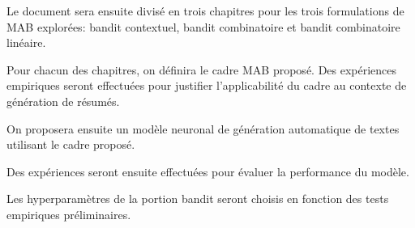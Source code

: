 Le document sera ensuite divisé en trois chapitres pour les trois formulations de MAB explorées:
bandit contextuel, bandit combinatoire et bandit combinatoire linéaire.

Pour chacun des chapitres, on définira le cadre MAB proposé.
Des expériences empiriques seront effectuées pour justifier l'applicabilité
du cadre au contexte de génération de résumés.

On proposera ensuite un modèle neuronal
de génération automatique de textes utilisant le cadre proposé.

Des expériences seront ensuite effectuées pour évaluer la performance du modèle.

Les hyperparamètres de la portion bandit seront choisis en fonction des tests
empiriques préliminaires.
